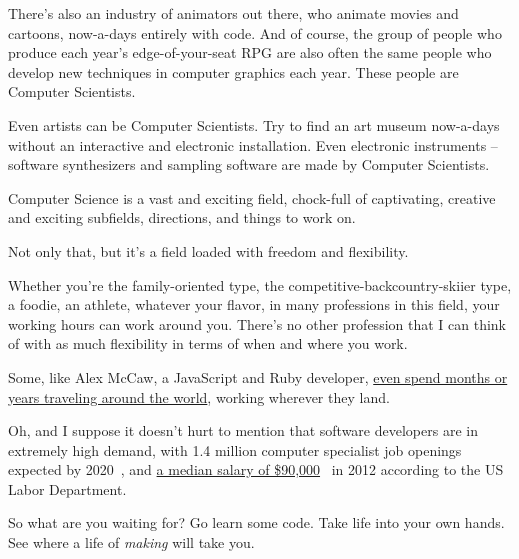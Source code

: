 \documentclass[acmtocl]{acmtrans2m}
\begin{document}
There's also an industry of animators out there, who animate movies and
cartoons, now-a-days entirely with code. And of course, the group of people
who produce each year's edge-of-your-seat RPG are also often the same people
who develop new techniques in computer graphics each year. These people are
Computer Scientists.

Even artists can be Computer Scientists. Try to find an art museum now-a-days
without an interactive and electronic installation. Even electronic
instruments -- software synthesizers and sampling software are made by
Computer Scientists.

Computer Science is a vast and exciting field, chock-full of captivating,
creative and exciting subfields, directions, and things to work on.

Not only that, but it's a field loaded with freedom and flexibility.

Whether you're the family-oriented type, the competitive-backcountry-skiier
type, a foodie, an athlete, whatever your flavor, in many professions in this
field, your working hours can work around you. There's no other profession
that I can think of with as much flexibility in terms of when and where you
work.

Some, like Alex McCaw, a JavaScript and Ruby developer,
\href{http://alexmaccaw.co.uk/posts/traveling\_writing\_programming}{even
spend months or years traveling around the world}, working wherever they land.

Oh, and I suppose it doesn't hurt to mention that software developers are in
extremely high demand, with 1.4 million computer specialist job openings
expected by 2020~\cite{NCWIT}, and \href{http://money.usnews.com/careers/best-
jobs/software-developer/salary}{a median salary of \$90,000}~\cite{USNews} in
2012 according to the US Labor Department.

So what are you waiting for? Go learn some code. Take life into your own
hands. See where a life of \textit{making} will take you.

\end{document}

